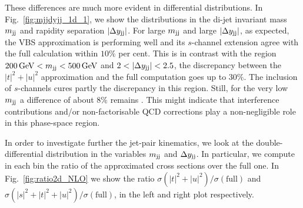 These differences are much more evident in differential distributions.
In Fig.~\ref{fig:mjjdyjj_1d_1}, we show the distributions in the di-jet invariant mass $m_{\text{j}\text{j}}$ and rapidity separation $|\Delta y_{\text{j}\text{j}}|$.
For large $m_{\text{j}\text{j}}$ and large $|\Delta y_{\text{j}\text{j}}|$, as expected, the VBS approximation is performing well and its $s$-channel extension agree with the full calculation within $10\%$ per cent.
This is in contrast with the region  $200 \,\text{GeV} < m_{\text{j}\text{j}} < 500 \,\text{GeV}$ and $2<|\Delta y_{\Pj\Pj}|<2.5$, the discrepancy between the $|t|^2 + |u|^2$ approximation and the full computation goes up to $30\%$.
The inclusion of $s$-channels cures partly the discrepancy in this region.
Still, for the very low $m_{\text{j}\text{j}}$ a difference of about $8\%$ remains .
This might indicate that interference contributions and/or non-factorisable QCD corrections play a non-negligible role in this phase-space region.

In order to investigate further the jet-pair kinematics, we look at the double-differential distribution in the variables $m_{\text{j}\text{j}}$ and $\Delta y_{\text{j}\text{j}}$.
In particular, we compute in each bin the ratio of the approximated cross sections over the full one.
In Fig.~\ref{fig:ratio2d_NLO} we show the ratio $\sigma(|t|^2 + |u|^2)/\sigma(\textrm{full})$ and $\sigma(|s|^2+|t|^2 + |u|^2)/\sigma(\textrm{full})$, in the left and right plot respectively.


